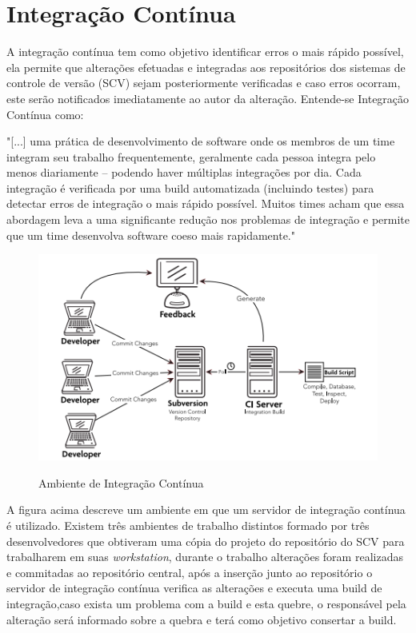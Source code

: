 
\section{Integração Contínua}\label{integracaocont}

A integração contínua tem como objetivo identificar erros o mais rápido possível, ela permite que alterações efetuadas e integradas aos repositórios dos sistemas de controle de versão (SCV) sejam posteriormente verificadas e caso erros ocorram, este serão notificados imediatamente ao autor da alteração.
Entende-se Integração Contínua como:
\begin{citacao}
"[...] uma prática de desenvolvimento de software onde os membros de um time integram seu trabalho frequentemente, geralmente cada pessoa integra pelo menos diariamente – podendo haver múltiplas integrações por dia. Cada integração é verificada por uma build automatizada (incluindo testes) para detectar erros de integração o mais rápido possível. Muitos times acham que essa abordagem leva a uma significante redução nos problemas de integração e permite que um time desenvolva software coeso mais rapidamente." 
\end{citacao}

\begin{figure}[tbh]
\centering
\caption[Ambiente de Integração Contínua]{Ambiente de Integração Contínua}
\includegraphics[width=0.7\linewidth]{./images/CI}
\label{fig:CI}
\end{figure}

A figura acima descreve um ambiente em que um servidor de integração contínua é utilizado. Existem três ambientes de trabalho distintos formado por três desenvolvedores que obtiveram uma cópia do projeto do repositório do SCV para trabalharem em suas \textit{workstation}, durante o trabalho alterações foram realizadas e commitadas ao repositório central, após a inserção junto ao repositório o servidor de integração contínua verifica as alterações e executa uma build de integração,caso exista um problema com a build e esta quebre, o responsável pela alteração será informado sobre a quebra e terá como objetivo consertar a build.

